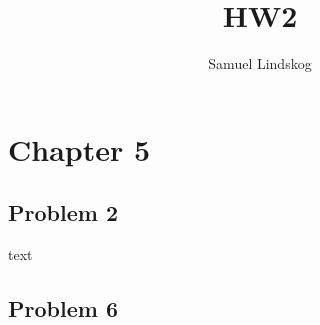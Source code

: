 \documentclass{article}
\begin{document}
\theoremstyle{definition}\newtheorem{defi}{Definition}[section]
\theoremstyle{definition}\newtheorem{thm}{Theorem}[section]
\theoremstyle{definition}\newtheorem{cor}{Corollary}
\theoremstyle{definition}\newtheorem{lem}{Lemma}[section]
\theoremstyle{definition}\newtheorem{prob}{Problem}
\theoremstyle{remark}\newtheorem*{notat}{Notation}

\title{HW2}
\author{Samuel Lindskog}
\maketitle

\setcounter{section}{1}
\setcounter{tocdepth}{1}

\section*{Chapter 5}
\subsection*{Problem 2}
text
\subsection*{Problem 6}
\end{document}
